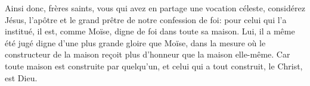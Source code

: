 Ainsi donc, frères saints, vous qui avez en partage une vocation céleste,
	considérez Jésus, l’apôtre et le grand prêtre de notre confession de foi:
	pour celui qui l’a institué, il est, comme Moïse, digne de foi dans toute sa maison.
Lui, il a même été jugé digne d’une plus grande gloire que Moïse,
	dans la mesure où le constructeur de la maison
		reçoit plus d’honneur que la maison elle-même.
Car toute maison est construite par quelqu’un,
	et celui qui a tout construit, le Christ, est Dieu.
